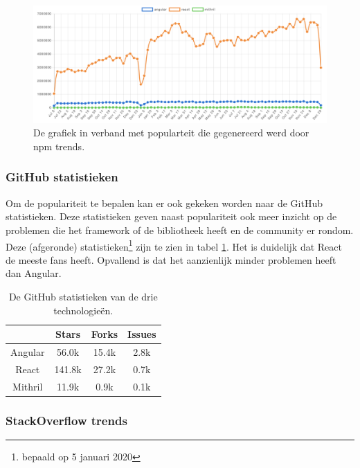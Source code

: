 \begin{figure}
    \includegraphics[width=\textwidth]{./img/npmtrends.png}
    \caption{De grafiek in verband met popularteit die gegenereerd werd door npm trends. }
    \label{fig:npmtrends}
\end{figure}

\subsubsection{GitHub statistieken}

Om de populariteit te bepalen kan er ook gekeken worden naar de GitHub statistieken. Deze statistieken geven naast populariteit ook meer inzicht op de problemen die het framework of de bibliotheek heeft en de community er rondom. Deze (afgeronde) statistieken\footnote{bepaald op 5 januari 2020} zijn te zien in tabel \ref{table:github}. Het is duidelijk dat React de meeste fans heeft. Opvallend is dat het aanzienlijk minder problemen heeft dan Angular.

\begin{table}
    \centering
    \begin{tabular}{|c|c|c|c|}
        \cline{2-4}
        \multicolumn{1}{c|}{} & Stars & Forks & Issues \\ \hline
        Angular & 56.0k &  15.4k & 2.8k\\ \hline
        React & 141.8k & 27.2k & 0.7k \\ \hline
        Mithril & 11.9k & 0.9k & 0.1k \\ \hline
        
    \end{tabular}
    \caption{De GitHub statistieken van de drie technologieën. }
    \label{table:github}
\end{table}

\subsubsection{StackOverflow trends}

